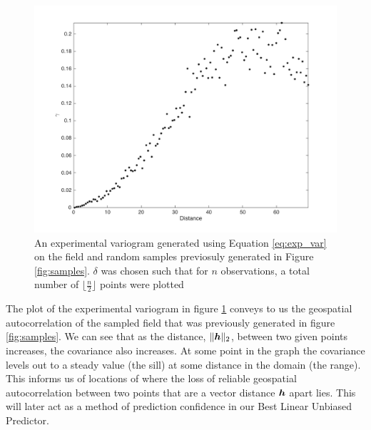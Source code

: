 \documentclass[11pt]{ucthesis}
\newcommand{\vect}[1]{{\it{\boldsymbol{#1}}}}
\begin{document}
\begin{figure}[H]
    \centering    
    \includegraphics[width=\linewidth]{figures/exp_variogram.png}
    \captionsetup{skip=0.5\baselineskip,size=footnotesize}
    \caption{An experimental variogram generated using Equation \ref{eq:exp_var} on the field and random samples previosuly generated in Figure \ref{fig:samples}. $\delta$ was chosen such that for $n$ observations, a total number of $\Big\lfloor \frac{n}{2} \Big\rfloor$ points were plotted}
    \label{fig:exp_var}
\end{figure}

The plot of the experimental variogram in figure \ref{fig:exp_var} conveys to us the geospatial autocorrelation of the sampled field that was previously generated in figure \ref{fig:samples}. We can see that as the distance, $\|\vect{h}\|_2$, between two given points increases, the covariance also increases. At some point in the graph the covariance levels out to a steady value (the sill) at some distance in the domain (the range). This informs us of locations of where the loss of reliable geospatial autocorrelation between two points that are a vector distance $\vect{h}$ apart lies. This will later act as a method of prediction confidence in our Best Linear Unbiased Predictor.
\end{document}
